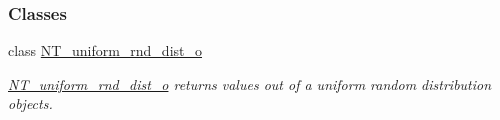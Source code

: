 \subsubsection*{Classes}
\begin{DoxyCompactItemize}
\item 
class \hyperlink{class_n_t__uniform__rnd__dist__o}{NT\_\-uniform\_\-rnd\_\-dist\_\-o}
\begin{DoxyCompactList}\small\item\em \hyperlink{class_n_t__uniform__rnd__dist__o}{NT\_\-uniform\_\-rnd\_\-dist\_\-o} returns values out of a uniform random distribution objects. \item\end{DoxyCompactList}\end{DoxyCompactItemize}

